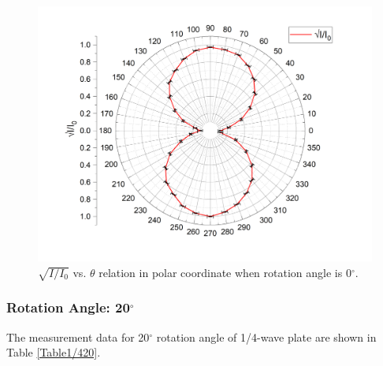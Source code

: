 \documentclass{article}
\begin{document}
\begin{figure}[H]\centering
\includegraphics[scale=0.6]{3.png}
\caption{$\sqrt{I/I_0}$ vs. $\theta$ relation in polar coordinate when rotation angle is 0$^\circ$.}\label{Fig0}
\end{figure}

\newpage

\subsubsection{Rotation Angle: 20$^\circ$}

The measurement data for 20$^\circ$ rotation angle of 1/4-wave plate are shown in Table \ref{Table1/420}.  
\end{document}
